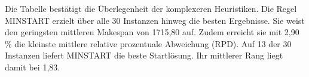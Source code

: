 \begin{table}[H]
    \centering
    \caption{Kennzahlen Vergleich der Giffler-Thompson-Prioritätsregeln}
    \label{tab:gt_aggregated}
\end{table}

Die Tabelle bestätigt die Überlegenheit der komplexeren Heuristiken.
Die Regel MINSTART erzielt über alle 30 Instanzen hinweg die besten Ergebnisse.
Sie weist den geringsten mittleren Makespan von 1715,80 auf.
Zudem erreicht sie mit 2,90\,\% die kleinste mittlere relative prozentuale Abweichung (RPD).
Auf 13 der 30 Instanzen liefert MINSTART die beste Startlösung.
Ihr mittlerer Rang liegt damit bei 1,83.

